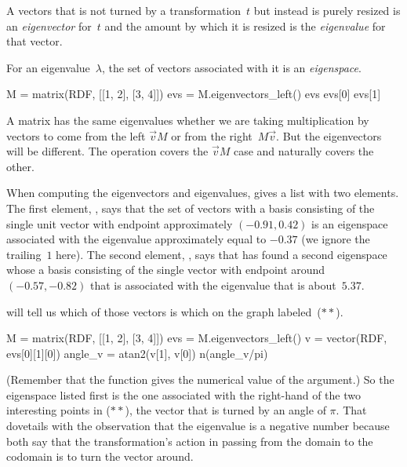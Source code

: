 A vectors that is not turned by a transformation~$t$ but instead
is purely resized 
is an \textit{eigenvector} for~$t$ and the amount by which it is 
resized is the \textit{eigenvalue} for that vector.

For an eigenvalue~$\lambda$, the set of vectors associated with
it is an \textit{eigenspace}.
\begin{sageoutput}[s,3,59,13]
M = matrix(RDF, [[1, 2], [3, 4]])
evs = M.eigenvectors_left()
evs
evs[0] 
evs[1]
\end{sageoutput}
\noindent
A matrix has the same eigenvalues whether we are taking multiplication 
by vectors to come from the left $\vec{v}M$ or from the 
right~$M\vec{v}$.  
But the eigenvectors will be different. 
The \Sage{} operation  covers the 
$\vec{v}M$ case and naturally 
covers the other.

When computing the eigenvectors and eigenvalues, \Sage{} gives a list
with two elements.
The first element, , 
says that the set of vectors with a basis consisting of the single unit
vector with endpoint approximately $(-0.91, 0.42)$  is an
eigenspace associated with the eigenvalue approximately equal to $-0.37$
(we ignore the trailing~$1$ here).
The second element, , 
says that \Sage{} has found a second eigenspace
whose a basis consisting of the single vector with endpoint around
$(-0.57, -0.82)$ that is associated with the
eigenvalue that is about~$5.37$. 

\Sage{} will tell us which of those vectors is which on the graph 
labeled~($**$).
\begin{sageoutput}
M = matrix(RDF, [[1, 2], [3, 4]])
evs = M.eigenvectors_left()
v = vector(RDF, evs[0][1][0])
angle_v = atan2(v[1], v[0]) 
n(angle_v/pi) 
\end{sageoutput}
(Remember that the  function gives the numerical value of
the argument.)
So the eigenspace listed first is the one associated with the right-hand
of the two interesting points in ($**$), the vector that is turned by an angle
of $\pi$.
That dovetails with the observation that the eigenvalue is a negative number 
because both say that the transformation's action in passing from the
domain to the codomain is to turn the vector around.

